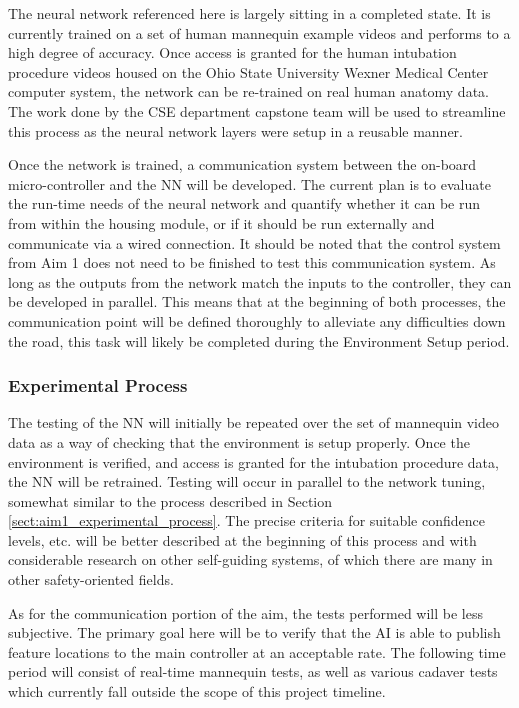 		The neural network referenced here is largely sitting in a completed state. It is currently trained on a set of human mannequin example videos and performs to a high degree of accuracy. Once access is granted for the human intubation procedure videos housed on the Ohio State University Wexner Medical Center computer system, the network can be re-trained on real human anatomy data. The work done by the CSE department capstone team will be used to streamline this process as the neural network layers were setup in a reusable manner.

		Once the network is trained, a communication system between the on-board micro-controller and the NN will be developed. The current plan is to evaluate the run-time needs of the neural network and quantify whether it can be run from within the housing module, or if it should be run externally and communicate via a wired connection. It should be noted that the control system from Aim 1 does not need to be finished to test this communication system. As long as the outputs from the network match the inputs to the controller, they can be developed in parallel. This means that at the beginning of both processes, the communication point will be defined thoroughly to alleviate any difficulties down the road, this task will likely be completed during the Environment Setup period.
	
	\subsubsection{Experimental Process}
	
		The testing of the NN will initially be repeated over the set of mannequin video data as a way of checking that the environment is setup properly. Once the environment is verified, and access is granted for the intubation procedure data, the NN will be retrained. Testing will occur in parallel to the network tuning, somewhat similar to the process described in Section \ref{sect:aim1_experimental_process}. The precise criteria for suitable confidence levels, etc. will be better described at the beginning of this process and with considerable research on other self-guiding systems, of which there are many in other safety-oriented fields.
		
		As for the communication portion of the aim, the tests performed will be less subjective. The primary goal here will be to verify that the AI is able to publish feature locations to the main controller at an acceptable rate. The following time period will consist of real-time mannequin tests, as well as various cadaver tests which currently fall outside the scope of this project timeline.

